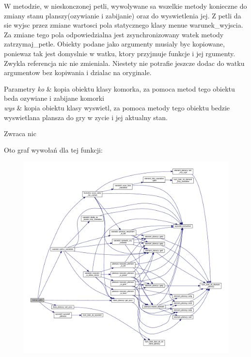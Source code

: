W metodzie, w nieskonczonej petli, wywolywane sa wszelkie metody konieczne do zmiany stanu planszy(ozywianie i zabijanie) oraz do wyswietlenia jej. Z petli da sie wyjsc przez zmiane wartosci pola statycznego klasy menue warunek\+\_\+wyjscia. Za zmiane tego pola odpowiedzialna jest zsynchronizowany watek metody zatrzymaj\+\_\+petle. Obiekty podane jako argumenty musialy byc kopiowane, poniewaz tak jest domyslnie w watku, ktory przyjmuje funkcje i jej rgumenty. Zwykla referencja nic nie zmieniala. Niestety nie potrafie jeszcze dodac do watku argumentow bez kopiwania i dzialac na oryginale. 
\begin{DoxyParams}{Parametry}
{\em ko} & kopia obiektu klasy komorka, za pomoca metod tego obiektu beda ozywiane i zabijane komorki \\
\hline
{\em wys} & kopia obiektu klasy wyswietl, za pomoca metody tego obiektu bedzie wyswietlana plansza do gry w zycie i jej aktualny stan. \\
\hline
\end{DoxyParams}
\begin{DoxyReturn}{Zwraca}
nic 
\end{DoxyReturn}
Oto graf wywołań dla tej funkcji\+:
\nopagebreak
\begin{figure}[H]
\begin{center}
\leavevmode
\includegraphics[width=350pt]{classmenue_a13c6c317f85272bf3fd49ff0ad93b28a_cgraph}
\end{center}
\end{figure}
